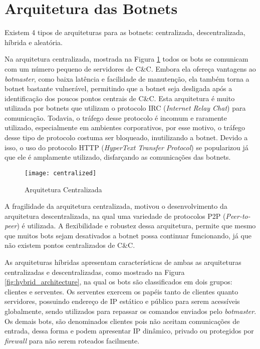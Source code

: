 \section{Arquitetura das Botnets}
Existem 4 tipos de arquiteturas para as botnets: centralizada, descentralizada, híbrida e aleatória. 

Na arquitetura centralizada, mostrada na Figura \ref{fig:centralized_architecture} todos os bots se comunicam com um número pequeno de servidores de C\&C. Embora ela ofereça vantagens ao \textit{botmaster}, como baixa latência e facilidade de manutenção, ela também torna a botnet bastante vulnerável, permitindo que a botnet seja desligada após a identificação dos poucos pontos centrais de C\&C. Esta arquitetura é muito utilizada por botnets que utilizam o protocolo IRC (\textit{Internet Relay Chat}) para comunicação. Todavia, o tráfego desse protocolo é incomum e raramente utilizado, especialmente em ambientes corporativos, por esse motivo, o tráfego desse tipo de protocolo costuma ser bloqueado, inutilizando a botnet. Devido a isso, o uso do protocolo HTTP (\textit{HyperText Transfer Protocol}) se popularizou já que ele é amplamente utilizado, disfarçando as comunicações das botnets.

\begin{figure}
\texttt{[image: centralized]}
\caption[Arquitetura Centralizada]{Arquitetura Centralizada\citep{wang2010advanced}} \label{fig:centralized_architecture}
\end{figure}

A fragilidade da arquitetura centralizada, motivou o desenvolvimento da arquitetura descentralizada, na qual uma variedade de protocolos P2P (\textit{Peer-to-peer}) é utilizada. A flexibilidade e robustez dessa arquitetura, permite que mesmo que muitos bots sejam desativados a botnet possa continuar funcionando, já que não existem pontos centralizados de C\&C. 

As arquiteturas híbridas apresentam características de ambas as arquiteturas centralizadas e descentralizadas, como mostrado na Figura \ref{fig:hybrid_architecture}, na qual os bots são classificados em dois grupos: clientes e serventes. Os serventes exercem os papéis tanto de clientes quanto servidores, possuindo endereço de IP estático e público para serem acessíveis globalmente, sendo utilizados para repassar os comandos enviados pelo \textit{botmaster}. Os demais bots, são denominados clientes pois não aceitam comunicações de entrada, dessa forma e podem apresentar IP dinâmico, privado ou protegidos por \textit{firewall} para não serem roteados facilmente. 

